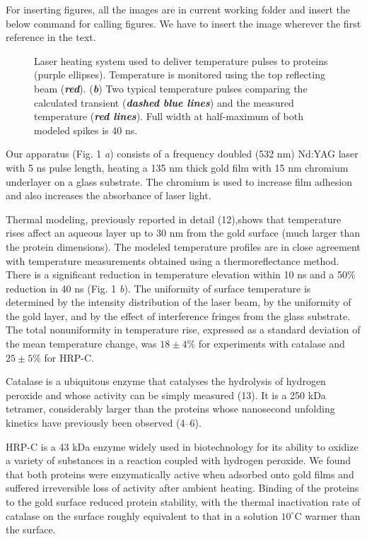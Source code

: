 \documentclass{biophys}
\begin{document}
For inserting figures, all the images are in current working folder and insert the below command
for calling figures. We have to insert the image wherever the first reference in the text.

\begin{figure}[t!]
\caption{Laser heating system used to deliver temperature pulses to proteins (purple ellipses). Temperature is monitored using the top reflecting beam ({\bfseries\itshape red}). ({\bfseries\itshape b}) Two typical temperature pulses comparing the calculated transient ({\bfseries\itshape dashed blue lines}) and the measured temperature ({\bfseries\itshape red lines}). Full width at half-maximum  of both modeled spikes is 40 ns.}
\end{figure}


Our apparatus (Fig. 1 {\it a}) consists of a frequency doubled (532 nm) Nd:YAG laser with 5 ns pulse length, heating a 135 nm thick gold film with 15 nm chromium underlayer on a glass substrate. The chromium is used to increase film adhesion and also increases the absorbance of laser light.

Thermal modeling, previously reported in detail (12),\break shows that temperature rises affect an aqueous layer up to 30 nm from the gold surface (much larger than the protein dimensions). The modeled temperature profiles are in close agreement with temperature measurements obtained using a thermoreflectance method. There is a significant reduction in temperature elevation within 10 ns and a 50\% reduction in 40 ns (Fig. 1 {\it b}). The uniformity of surface temperature is determined by the intensity distribution of the laser beam, by the uniformity of the gold layer, and by the effect of interference fringes from the glass substrate. The total nonuniformity in temperature rise, expressed as a standard deviation of the mean temperature change, was $18 \pm 4\%$ for experiments with catalase and $25 \pm 5\%$ for HRP-C.

Catalase is a ubiquitous enzyme that catalyses the hydrolysis of hydrogen peroxide and whose activity can be simply measured (13). It is a 250 kDa tetramer, considerably larger than the proteins whose nanosecond unfolding kinetics have previously been observed (4--6).

HRP-C is a 43 kDa enzyme widely used in biotechnology for its ability to oxidize a variety of substances in a reaction coupled with hydrogen peroxide. We found that both proteins were enzymatically active when adsorbed onto gold films and suffered irreversible loss of activity after ambient heating. Binding of the proteins to the gold surface reduced protein stability, with the thermal inactivation rate of catalase on the surface roughly equivalent to that in a solution $10^\circ$C warmer than the surface.
\end{document}
